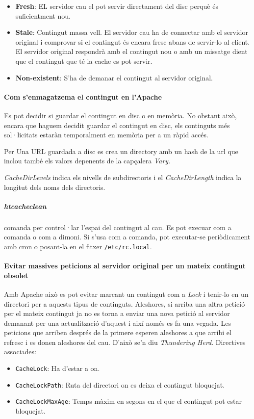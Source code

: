 \documentclass[a4paper, 11pt]{article}
\begin{document}
\begin{itemize}
	\item \textbf{Fresh}: EL servidor cau el pot servir directament del disc perquè \'es suficientment nou.
	\item \textbf{Stale}: Contingut massa vell. El servidor cau ha de connectar amb el servidor original i comprovar si el contingut \'es encara fresc abans de servir-lo al client. El servidor original respondrà amb el contingut nou o amb un missatge dient que el contingut que t\'e la cache es pot servir.
	\item \textbf{Non-existent}: S'ha de demanar el contingut al servidor original. 
\end{itemize}

\paragraph{Com s'enmagatzema el contingut en l'Apache } Es pot decidir si guardar el contingut en disc o en memòria. No obstant això, encara que haguem decidit guardar el contingut en disc, els continguts m\'es sol·licitats estaràn temporalment en memòria per a un ràpid acc\'es.

Per Una URL guardada a disc es crea un directory amb un hash de la url que inclou tamb\'e els valors depenents de la capçalera \textit{Vary}.

\textit{CacheDirLevels} indica els nivells de subdirectoris i el \textit{CacheDirLength} indica la longitut dels noms dels directoris.

\subparagraph{htcacheclean} comanda per control·lar l'espai del contingut al cau. Es pot execuar com a comanda o com a dimoni. Si s'usa com a comanda, pot executar-se periòdicament amb cron o posant-la en el fitxer \verb+/etc/rc.local+.

\paragraph{Evitar massives peticions al servidor original per un mateix contingut obsolet \\}

Amb Apache això es pot evitar marcant un contingut com a \textit{Lock} i tenir-lo en un directori per a aquests tipus de continguts. Aleshores, si arriba una altra petició per el mateix contingut ja no es torna a enviar una nova petició al servidor demanant per una actualització d'aquest i així nom\'es es fa una vegada. Les peticions que arriben despr\'es de la primere esperen aleshores a que arribi el refresc i es donen aleshores del cau. D'això se'n diu \textit{Thundering Herd}. Directives associades:
\begin{itemize}
	\item \verb+CacheLock+: Ha d'estar a on.
	\item \verb+CacheLockPath+: Ruta del directori on es deixa el contingut bloquejat.
	\item \verb+CacheLockMaxAge+: Temps màxim en segons en el que el contingut pot estar bloquejat.
\end{itemize}
\end{document}
